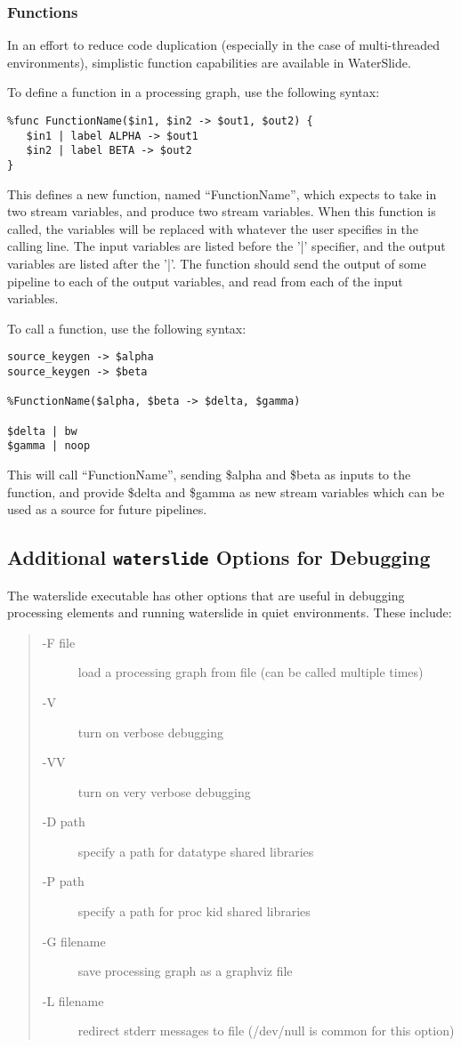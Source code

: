 \documentclass[11pt]{article}
\begin{document}
\subsubsection{Functions}

In an effort to reduce code duplication (especially in the case of 
multi-threaded environments), simplistic function capabilities are available 
in WaterSlide.

To define a function in a processing graph, use the following syntax:
\begin{lstlisting}
%func FunctionName($in1, $in2 -> $out1, $out2) {
   $in1 | label ALPHA -> $out1
   $in2 | label BETA -> $out2
}
\end{lstlisting}

This defines a new function, named ``FunctionName'', which expects to take 
in two stream variables, and produce two stream variables.  When this 
function is called, the variables will be replaced with whatever the user 
specifies in the calling line.   The input variables are listed before the 
'|' specifier, and the output variables are listed after the '|'.  The 
function should send the output of some pipeline to each of the output 
variables, and read from each of the input variables.

To call a function, use the following syntax:
\begin{lstlisting}
source_keygen -> $alpha
source_keygen -> $beta

%FunctionName($alpha, $beta -> $delta, $gamma)

$delta | bw
$gamma | noop
\end{lstlisting}

This will call ``FunctionName'', sending \$alpha and \$beta as inputs to the 
function, and provide \$delta and \$gamma as new stream variables which can 
be used as a source for future pipelines.

\subsection{Additional \texttt{waterslide} Options for Debugging}
The waterslide executable has other options that are useful in debugging processing elements and
running waterslide in quiet environments.  These
include:
\begin{quote}
\begin{description}
\item [-F file] load a processing graph from file (can be called multiple times)
\item [-V] turn on verbose debugging
\item [-VV] turn on very verbose debugging
\item [-D path] specify a path for datatype shared libraries 
\item [-P path] specify a path for proc kid shared libraries 
\item [-G filename] save processing graph as a graphviz file
\item [-L filename] redirect stderr messages to file (/dev/null is common for this option)
\end{description}
\end{quote}
\end{document}
